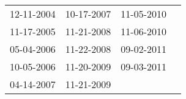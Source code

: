 \begin{supertabular}{llll}
 12-11-2004 &  10-17-2007 &  11-05-2010 \\
 11-17-2005 &  11-21-2008 &  11-06-2010 \\
 05-04-2006 &  11-22-2008 &  09-02-2011 \\
 10-05-2006 &  11-20-2009 &  09-03-2011 \\
 04-14-2007 &  11-21-2009 &             \\
\end{supertabular}
